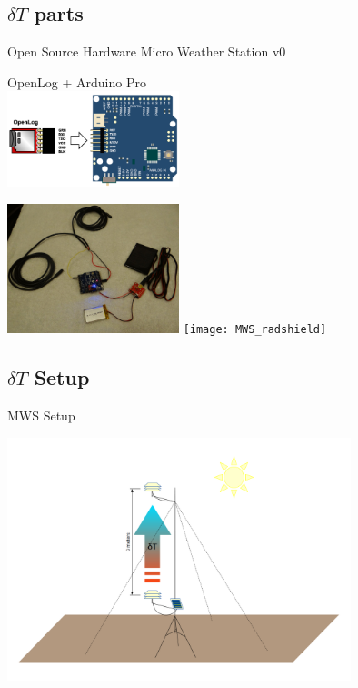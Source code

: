 \documentclass[xcolor=dvipsnames,beamer]{beamer} %
\begin{document}
\subsection{ $\delta T$ parts}
\begin{frame}[fragile]{Open Source Hardware Micro Weather Station v0}

\begin{center}
OpenLog + Arduino Pro\\
\vspace{5mm}
\includegraphics[width=5cm]{Arduino_OpenLog}
\end{center}

\begin{flushright}
  \includegraphics[width=5cm]{MWS}
  \hspace{5mm}
  \texttt{[image: MWS\_radshield]}
\end{flushright}
\end{frame}

\subsection{ $\delta T$ Setup}
\begin{frame}[fragile]{MWS Setup}

\begin{center}
 \includegraphics[width=10cm]{MWS_v1_deltaT_sketch_hot}
\end{center}

\end{frame}
\end{document}
